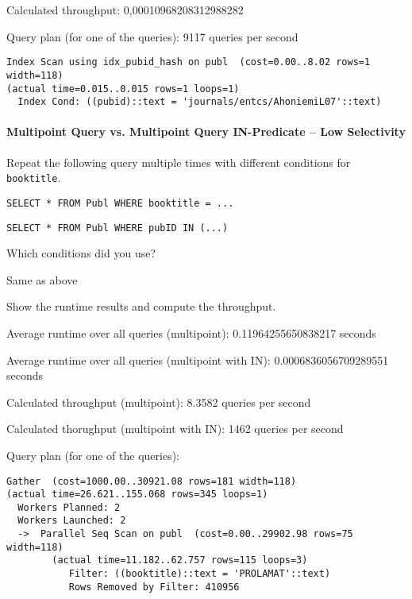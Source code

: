 \documentclass[11pt]{scrartcl}
\begin{document}
Calculated throughput: 0,00010968208312988282

Query plan (for one of the queries): 9117 queries per second

{\small
\parskip0pt\begin{verbatim}
Index Scan using idx_pubid_hash on publ  (cost=0.00..8.02 rows=1 width=118) 
(actual time=0.015..0.015 rows=1 loops=1)
  Index Cond: ((pubid)::text = 'journals/entcs/AhoniemiL07'::text)
\end{verbatim}}

\paragraph{Multipoint Query vs. Multipoint Query IN-Predicate -- Low Selectivity}

Repeat the following query multiple times with different conditions for \texttt{booktitle}.

\begin{lstlisting}[style=dbtsql]
SELECT * FROM Publ WHERE booktitle = ...
\end{lstlisting}

\begin{lstlisting}[style=dbtsql]
SELECT * FROM Publ WHERE pubID IN (...)
\end{lstlisting}


Which conditions did you use?

Same as above

Show the runtime results and compute the throughput.

Average runtime over all queries (multipoint): 0.11964255650838217 seconds

Average runtime over all queries (multipoint with IN): 0.0006836056709289551 seconds

Calculated throughput (multipoint): 8.3582 queries per second

Calculated thorughput (multipoint with IN): 1462 queries per second

Query plan (for one of the queries): 

{\small
\parskip0pt\begin{verbatim}
Gather  (cost=1000.00..30921.08 rows=181 width=118) 
(actual time=26.621..155.068 rows=345 loops=1)
  Workers Planned: 2
  Workers Launched: 2
  ->  Parallel Seq Scan on publ  (cost=0.00..29902.98 rows=75 width=118) 
        (actual time=11.182..62.757 rows=115 loops=3)
           Filter: ((booktitle)::text = 'PROLAMAT'::text)
           Rows Removed by Filter: 410956   
\end{verbatim}}
\end{document}
